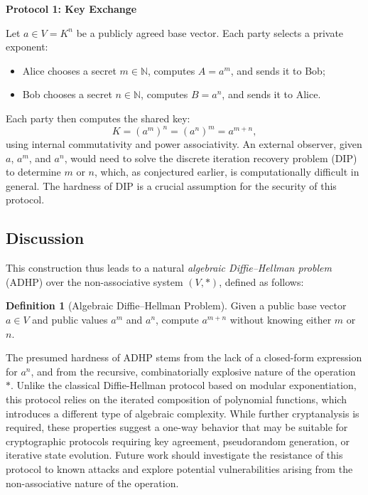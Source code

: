 \documentclass[12pt]{article}
\theoremstyle{definition}
\newtheorem{definition}{Definition}[section]
\theoremstyle{plain}
\theoremstyle{remark}
\begin{document}
\textbf{Protocol 1: Key Exchange}

Let \( a \in V = K^n \) be a publicly agreed base vector. Each party selects a private exponent:
\begin{itemize}
    \item Alice chooses a secret \( m \in \mathbb{N} \), computes \( A = a^m \), and sends it to Bob;
    \item Bob chooses a secret \( n \in \mathbb{N} \), computes \( B = a^n \), and sends it to Alice.
\end{itemize}

Each party then computes the shared key:
\[
K = (a^m)^n = (a^n)^m = a^{m+n},
\]
using internal commutativity and power associativity. An external observer, given \( a \), \( a^m \), and \( a^n \), would need to solve the discrete iteration recovery problem (DIP) to determine \( m \) or \( n \), which, as conjectured earlier, is computationally difficult in general. The hardness of DIP is a crucial assumption for the security of this protocol.

\subsection*{Discussion}

This construction thus leads to a natural \emph{algebraic Diffie–Hellman problem} (ADHP) over the non-associative system \( (V, *) \), defined as follows:

\begin{definition}[Algebraic Diffie–Hellman Problem]
Given a public base vector \( a \in V \) and public values \( a^m \) and \( a^n \), compute \( a^{m+n} \) without knowing either \( m \) or \( n \).
\end{definition}

The presumed hardness of ADHP stems from the lack of a closed-form expression for \( a^n \), and from the recursive, combinatorially explosive nature of the operation \( * \). Unlike the classical Diffie-Hellman protocol based on modular exponentiation, this protocol relies on the iterated composition of polynomial functions, which introduces a different type of algebraic complexity. While further cryptanalysis is required, these properties suggest a one-way behavior that may be suitable for cryptographic protocols requiring key agreement, pseudorandom generation, or iterative state evolution. Future work should investigate the resistance of this protocol to known attacks and explore potential vulnerabilities arising from the non-associative nature of the operation.
\end{document}
